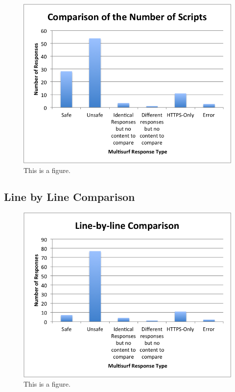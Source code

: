 \begin{figure}[htb]
\begin{center}
\includegraphics[width=\linewidth]{scripts}
\caption{This is a figure.}
\end{center}
\end{figure}

\subsection{Line by Line Comparison}

\begin{figure}[htb]
\begin{center}
\includegraphics[width=\linewidth]{lines}
\caption{This is a figure.}
\end{center}
\end{figure}

